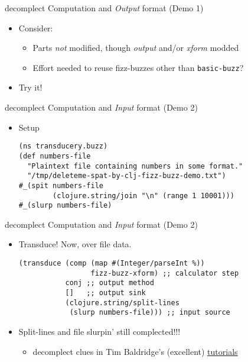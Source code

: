 \documentclass[presentation]{beamer}
\begin{document}
\begin{frame}[label={sec:org2cc110a},fragile]{decomplect Computation and \emph{Output} format (Demo 1)}
 \begin{itemize}
\item Consider:
\begin{itemize}
\item Parts \emph{not} modified, though \emph{output} and/or \emph{xform} modded
\item Effort needed to reuse fizz-buzzes other than \texttt{basic-buzz}?
\end{itemize}
\item Try it!
\end{itemize}
\end{frame}
\begin{frame}[label={sec:orgd89be41},fragile]{decomplect Computation and \emph{Input} format (Demo 2)}
 \begin{itemize}
\item Setup
\begin{verbatim}
(ns transducery.buzz)
(def numbers-file
  "Plaintext file containing numbers in some format."
  "/tmp/deleteme-spat-by-clj-fizz-buzz-demo.txt")
#_(spit numbers-file
        (clojure.string/join "\n" (range 1 10001)))
#_(slurp numbers-file)
\end{verbatim}
\end{itemize}
\end{frame}
\begin{frame}[label={sec:org2a66945},fragile]{decomplect Computation and \emph{Input} format (Demo 2)}
 \begin{itemize}
\item Transduce! Now, over file data.
\begin{verbatim}
(transduce (comp (map #(Integer/parseInt %))
                 fizz-buzz-xform) ;; calculator step
           conj ;; output method
           []   ;; output sink
           (clojure.string/split-lines
            (slurp numbers-file))) ;; input source
\end{verbatim}
\item Split-lines and file slurpin' still complected!!!
\begin{itemize}
\item decomplect clues in Tim Baldridge's (excellent) \uline{\href{https://tbaldridge.pivotshare.com/categories/transducers/2426/media}{tutorials}}
\end{itemize}
\end{itemize}
\end{frame}
\end{document}
